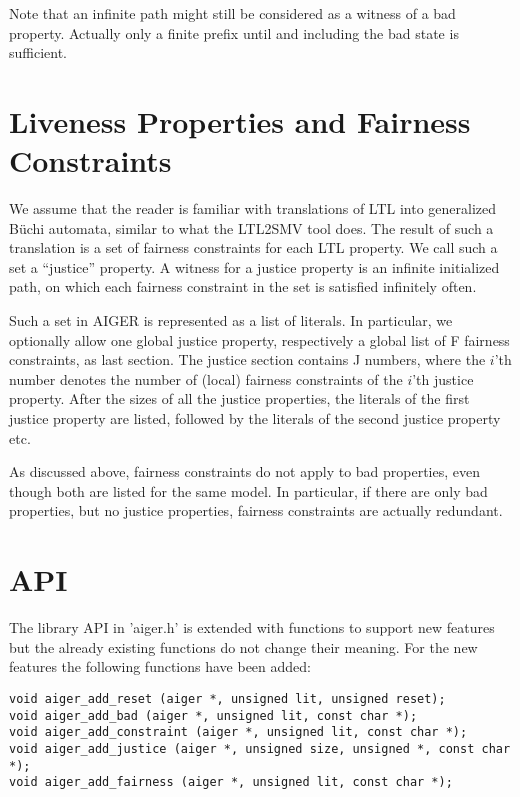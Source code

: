 \documentclass{llncs}
\begin{document}
Note that an infinite path might still be considered as a witness of a bad
property.  Actually only a finite prefix until and including the bad state
is sufficient.

\section{Liveness Properties and Fairness Constraints}

We assume that the reader is familiar with translations of LTL into
generalized B\"{u}chi automata, similar to what the LTL2SMV tool does.
The result of such a translation is a set of fairness constraints for each
LTL property.  We call such a set a ``justice'' property.  A witness for a
justice property is an infinite initialized path, on which each
fairness constraint in the set is satisfied infinitely often.

Such a set in AIGER is represented as a list of literals.  In particular, we
optionally allow one global justice property, respectively a global list of
F fairness constraints, as last section.  The justice section contains J
numbers, where the $i$'th number denotes the number of (local) fairness
constraints of the $i$'th justice property.  After the sizes of all the
justice properties, the literals of the first justice property are listed,
followed by the literals of the second justice property etc.

As discussed above, fairness constraints do not apply to bad properties, even
though both are listed for the same model.  In particular, if there are only
bad properties, but no justice properties, fairness constraints are actually
redundant.

\section{API}

The library API in 'aiger.h' is extended with functions to support new
features but the already existing functions do not change their meaning.
For the new features the following functions have been added:
{\small
\begin{verbatim}
void aiger_add_reset (aiger *, unsigned lit, unsigned reset);
void aiger_add_bad (aiger *, unsigned lit, const char *);
void aiger_add_constraint (aiger *, unsigned lit, const char *);
void aiger_add_justice (aiger *, unsigned size, unsigned *, const char *);
void aiger_add_fairness (aiger *, unsigned lit, const char *);
\end{verbatim}}
\end{document}
